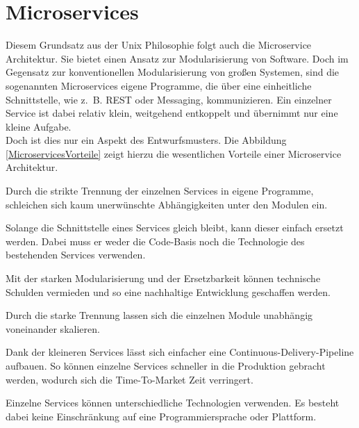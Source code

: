 \section{Microservices}


Diesem Grundsatz aus der Unix Philosophie folgt auch die Microservice Architektur. Sie bietet einen Ansatz zur Modularisierung von Software. Doch im Gegensatz zur konventionellen Modularisierung von großen Systemen, sind die sogenannten Microservices eigene Programme\cite[10]{Wolff2015}, die über eine einheitliche Schnittstelle, wie z.~B. \ac{REST} oder Messaging, kommunizieren. Ein einzelner Service ist dabei relativ klein, weitgehend entkoppelt und  übernimmt nur eine kleine Aufgabe.\\
Doch ist dies nur ein Aspekt des Entwurfsmusters. Die Abbildung \ref{MicroservicesVorteile} zeigt hierzu die wesentlichen Vorteile einer Microservice Architektur.


\begin{description}[leftmargin=!,labelwidth=\widthof{\bfseries Ergänzung Legacy-Systeme}]
	\item[Starke Modularisierung] 
	 	Durch die strikte Trennung der einzelnen Services in eigene Programme, schleichen sich kaum unerwünschte Abhängigkeiten unter den Modulen ein.
	\item[Ersetzbarkeit]
		Solange die Schnittstelle eines Services gleich bleibt, kann dieser einfach ersetzt werden. Dabei muss er weder die Code-Basis noch die Technologie des bestehenden Services verwenden.
	\item[Nachhaltige Entwicklung] 
		Mit der starken Modularisierung und der Ersetzbarkeit können technische Schulden vermieden und so eine nachhaltige Entwicklung geschaffen werden.
	\item[Effiziente Skalierung]
		Durch die starke Trennung lassen sich die einzelnen Module unabhängig voneinander skalieren.
	\item[Continuous Delivery]
		Dank der kleineren Services lässt sich einfacher eine Continuous-Delivery-Pipeline aufbauen. So können einzelne Services schneller in die Produktion gebracht werden, wodurch sich die Time-To-Market Zeit verringert. 
	\item[Technologie Freiheit]
		Einzelne Services können unterschiedliche Technologien verwenden. Es besteht dabei keine Einschränkung auf eine Programmiersprache oder Plattform.
\end{description}

